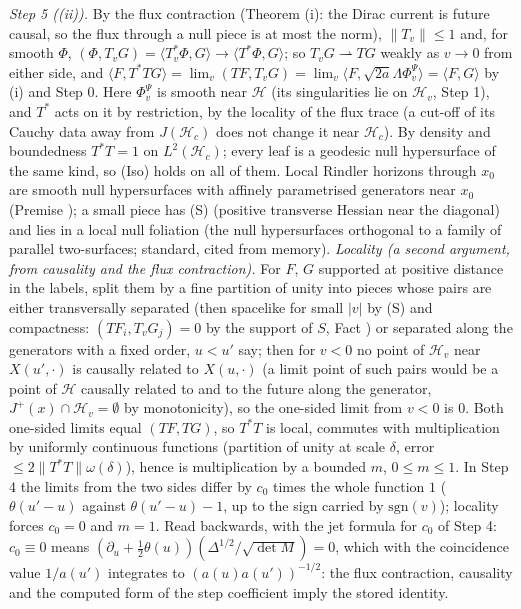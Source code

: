 \emph{Step 5 ((ii)).} By the flux contraction (Theorem (i): the Dirac current is future causal, so the flux through a null piece is at most the norm), $\|T_{v}\| \le 1$ and, for smooth $\Phi$, $(\Phi, T_{v}G) = \langle T_{v}^{*}\Phi, G\rangle \to \langle T^{*}\Phi, G\rangle$; so $T_{v}G \rightharpoonup TG$ weakly as $v \to 0$ from either side, and $\langle F, T^{*}TG\rangle = \lim_{v}(TF, T_{v}G) = \lim_{v}\langle F, \sqrt{2a}\Lambda\Phi^{\Psi}_{v}\rangle = \langle F, G\rangle$ by (i) and Step 0. Here $\Phi^{\Psi}_{v}$ is smooth near $\mathcal{H}$ (its singularities lie on $\mathcal{H}_{v}$, Step 1), and $T^{*}$ acts on it by restriction, by the locality of the flux trace (a cut-off of its Cauchy data away from $J(\mathcal{H}_{c})$ does not change it near $\mathcal{H}_{c}$). By density and boundedness $T^{*}T = 1$ on $L^{2}(\mathcal{H}_{c})$; every leaf is a geodesic null hypersurface of the same kind, so (Iso) holds on all of them. Local Rindler horizons through $x_{0}$ are smooth null hypersurfaces with affinely parametrised generators near $x_{0}$ (Premise ); a small piece has (S) (positive transverse Hessian near the diagonal) and lies in a local null foliation (the null hypersurfaces orthogonal to a family of parallel two-surfaces; standard, cited from memory).
\emph{Locality (a second argument, from causality and the flux contraction).} For $F$, $G$ supported at positive distance in the labels, split them by a fine partition of unity into pieces whose pairs are either transversally separated (then spacelike for small $|v|$ by (S) and compactness: $(TF_{i}, T_{v}G_{j}) = 0$ by the support of $S$, Fact ) or separated along the generators with a fixed order, $u < u'$ say; then for $v < 0$ no point of $\mathcal{H}_{v}$ near $X(u', \cdot)$ is causally related to $X(u, \cdot)$ (a limit point of such pairs would be a point of $\mathcal{H}$ causally related to and to the future along the generator, $J^{+}(x)\cap\mathcal{H}_{v} = \emptyset$ by monotonicity), so the one-sided limit from $v < 0$ is $0$. Both one-sided limits equal $(TF, TG)$, so $T^{*}T$ is local, commutes with multiplication by uniformly continuous functions (partition of unity at scale $\delta$, error $\le 2\|T^{*}T\|\omega(\delta)$), hence is multiplication by a bounded $m$, $0 \le m \le 1$. In Step 4 the limits from the two sides differ by $c_{0}$ times the whole function $1$ ($\theta(u' - u)$ against $\theta(u' - u) - 1$, up to the sign carried by $\mathrm{sgn}(v)$); locality forces $c_{0} = 0$ and $m = 1$. Read backwards, with the jet formula for $c_{0}$ of Step 4: $c_{0} \equiv 0$ means $(\partial_{u} + \tfrac12\theta(u))(\Delta^{1/2}/\sqrt{\det M}) = 0$, which with the coincidence value $1/a(u')$ integrates to $(a(u)a(u'))^{-1/2}$: the flux contraction, causality and the computed form of the step coefficient imply the stored identity.
